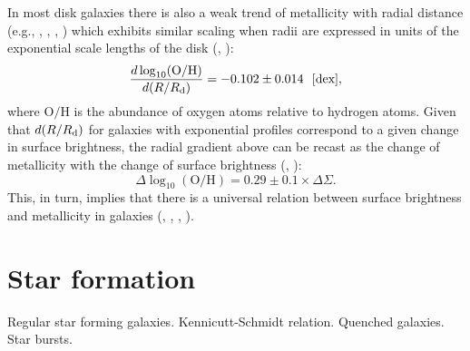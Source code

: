 In most disk galaxies there is also a weak trend of metallicity with radial distance (e.g., \href{http://adsabs.harvard.edu/abs/2014AJ....147..131P}{\citealt{pilyugin_etal14a}}, \href{http://adsabs.harvard.edu/abs/2015MNRAS.450.3254}{\citealt{pilyugin_etal15}}, \href{http://adsabs.harvard.edu/abs/2014A%26A...563A..49S}{\citealt{sanchez_etal14}}, \href{http://adsabs.harvard.edu/abs/2015MNRAS.454.3664B}{\citealt{bresolin_kennicutt15}}) which exhibits similar scaling when radii are expressed in units of the exponential scale lengths of the disk (\href{http://adsabs.harvard.edu/abs/2014A%26A...563A..49S}{\citealt{sanchez_etal14}}, \href{http://adsabs.harvard.edu/abs/2015MNRAS.454.3664B}{\citealt{bresolin_kennicutt15}}):
\begin{equation}
\frac{d\log_{10}(\mathrm{O/H})}{d(R/R_{\rm d})}=-0.102\pm 0.014\ \ \mathrm{[dex]},
\label{eq:universalZpro}
\end{equation}
where $\mathrm{O/H}$ is the abundance of oxygen atoms relative to hydrogen atoms. Given that $d(R/R_{\rm d})$ for galaxies with exponential profiles correspond to a given change in surface brightness, the radial gradient above can be recast as the change of metallicity with the change of surface brightness (\href{}{\citealt{pilyugin_etal14b}}, \href{http://adsabs.harvard.edu/abs/2015MNRAS.454.3664B}{\citealt{bresolin_kennicutt15}}): 
\begin{equation}
\Delta\log_{10}(\mathrm{O/H})=0.29\pm 0.1 \times \Delta\Sigma.
\label{eq:universalZpro}
\end{equation}
This, in turn, implies that there is a universal relation between surface brightness and metallicity in galaxies (\href{http://adsabs.harvard.edu/abs/1984MNRAS.211..507E}{\citealt{edmunds_pagel84}}, \href{http://adsabs.harvard.edu/abs/1995ApJ...444..610R}{\citealt{ryder95}}, \href{http://adsabs.harvard.edu/abs/2014AJ....148..134P}{\citealt{pilyugin_etal14b}}, \href{http://adsabs.harvard.edu/abs/2014A%26A...563A..49S}{\citealt{sanchez_etal14}}). 


\section{Star formation}
\label{sec:sfoverview}

Regular star forming galaxies. Kennicutt-Schmidt relation. Quenched galaxies. Star bursts.

